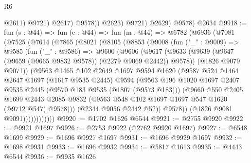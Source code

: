 \begin{lexlean}{R6}
\begin{coremodule}
                      @2611)
                    @9721)
                  @2617)
                @9578))
            @2623)
          @9721)
        @2629)
      @9578)
    @2634
@9918 := fun (s : @44) =>
  fun (e : @44) =>
  fun (m : @44) =>
  @6782
    (@6936
      (@7081
        (@7525
          (@7614
            (@7865
              (@8021
                (@8105
                  (@8853
                    (@9008
                      (fun ("_" : @9009) =>
                      @9585
                        (fun ("_" : @9586) =>
                        @9600
                          (@9606
                            (@9617
                              (@9633
                                (@9639
                                  (@9647 (@9659 (@9665 @9832 @9578)) (@2279 @9069 @2442))
                                  @9578))
                              (@1826 @9079 @9071))
                            (@9563
                              @1465
                              @102
                              @2649
                              @1697
                              @9594
                              @1620
                              (@9587
                                @524
                                @1464
                                @2647
                                @1697
                                (@1617 @9535 @2445)
                                @9594
                                (@9563
                                  @196
                                  @1020
                                  @1697
                                  @2407
                                  @9535
                                  @2445
                                  (@9570 @183 @9535 (@1807 (@9573 @183)))
                                  (@9660
                                    @550
                                    @2405
                                    @1699
                                    @2443
                                    @2085
                                    @9832
                                    (@9563 @548 @102 @1697 @1697 @547 @1620 (@9712 @547) @9578)))
                                (@2344 @9056 @2442 @52))
                              @9578))
                          (@1826 @9081 @9091))))))))))))
@9920 := @1702 @1626 @6544
@9921 := @2755 @9920
@9922 := @9921 @1697
@9926 := @2753 @9922 (@2762 @9920 @1697)
@9927 := @6548 @1699
@9929 := @1696 @9927 @1697
@9931 := @1696 @9929 @1697
@9932 := @1698 @9931
@9933 := @1696 @9932
@9934 := @5817 @1613
@9935 := @4443 @6544
@9936 := @9935 @1626

\end{coremodule}
\end{lexlean}
